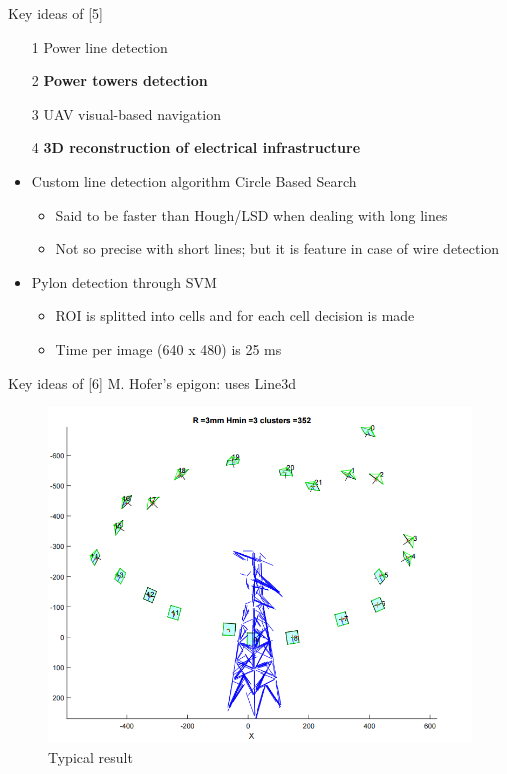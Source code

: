 \documentclass{beamer}
\begin{document}
\begin{frame}[t, fragile]{Key ideas of [5]}
\begin{itemize}
\item [1] Power line detection
\item [2] \textbf{Power towers detection}
\item [3] UAV visual-based navigation
\item [4] \textbf{3D reconstruction of electrical infrastructure}
\end{itemize}

\begin{itemize}
\item Custom line detection algorithm Circle Based Search
\begin{itemize}
\item Said to be faster than Hough/LSD when dealing with long lines
\item Not so precise with short lines; but it is feature in case of wire detection
\end{itemize}
\item Pylon detection through SVM
\begin{itemize}
\item ROI is splitted into cells and for each cell decision is made
\item Time per image (640 x 480) is 25 ms 
\end{itemize}
\end{itemize}
\end{frame}

\begin{frame}[t, fragile]{Key ideas of [6]}
M. Hofer's epigon: uses Line3d

\begin{figure}
\centering
\includegraphics[scale=0.25]{morrarjee}
\captionsetup{labelformat=empty}
\caption{Typical result}
\end{figure}
\end{frame}
\end{document}
